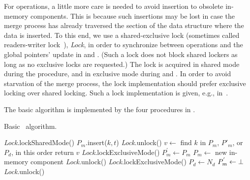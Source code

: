 
For  operations, a little more care is needed to avoid insertion to obsolete in-memory components.
This is because such insertions may be lost in case the merge process has already traversed the
section of the data structure where the data is inserted.
To this end, we use a shared-exclusive lock (sometimes called readers-writer lock~\cite{ConcurrencyInWindows2008}),
 \emph{Lock}, in order to synchronize between  operations
and the global pointers' update in  and .
(Such a lock does  not block shared lockers  as long as no exclusive locks are requested.)
The lock is acquired in shared mode during the  procedure,
and in exclusive mode during  and .
In order to avoid starvation of the merge process, the lock implementation should prefer
exclusive locking over shared locking. Such a lock implementation is given, e.g., in~\cite{libcds}.

The basic algorithm is implemented by the four procedures in .

\begin{algorithm} [th!]
\small
\caption{\small  Basic \clsm\ algorithm.}
\label{alg:client}
%
\begin{algorithmic}[1]
\makeatletter\setcounter{ALG@line}{0}\makeatother
%
     \State \emph{Lock}.lockSharedMode() \label{beginPut1}
     \State $P_{m}$.insert($k,t$)
     \State \emph{Lock}.unlock()
\EndProcedure
%
\vspace{3pt}
%
    \State $v \gets$ find $k$ in $P_{m}$, $P'_{m}$, or $P_{d}$, in this order
    \State return $v$
\EndProcedure
%
\vspace{3pt}
%
   \State \emph{Lock}.lockExclusiveMode()
   \State $P_{m}^{'} \gets P_{m}$
   \State $P_{m} \gets$ new in-memory component
   \State \emph{Lock}.unlock()
\EndProcedure
%
\vspace{3pt}
%
   \State \emph{Lock}.lockExclusiveMode()
   \State $P_{d} \gets N_d$
   \State $P_{m}^{'} \gets \bot$
   \State \emph{Lock}.unlock()
\EndProcedure
\end{algorithmic}
\label{Al:basicAlg}
\end{algorithm}

